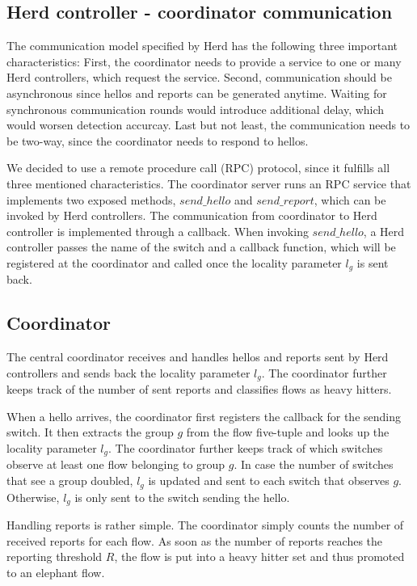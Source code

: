 \documentclass[11pt,oneside,a4paper]{article}
\begin{document}
\subsection{Herd controller - coordinator communication} \label{communication}

The communication model specified by Herd has the following three important characteristics: First, the coordinator needs to provide a service to one or many Herd controllers, which request the service. Second, communication should be asynchronous since hellos and reports can be generated anytime. Waiting for synchronous communication rounds would introduce additional delay, which would worsen detection accurcay. Last but not least, the communication needs to be two-way, since the coordinator needs to respond to hellos.

We decided to use a remote procedure call (RPC) protocol, since it fulfills all three mentioned characteristics. The coordinator server runs an RPC service that implements two exposed methods, $send\_hello$ and $send\_report$, which can be invoked by Herd controllers. The communication from coordinator to Herd controller is implemented through a callback. When invoking $send\_hello$, a Herd controller passes the name of the switch and a callback function, which will be registered at the coordinator and called once the locality parameter $l_g$ is sent back.


\subsection{Coordinator} \label{coordinator}
The central coordinator receives and handles hellos and reports sent by Herd controllers and sends back the locality parameter $l_g$. The coordinator further keeps track of the number of sent reports and classifies flows as heavy hitters.

\noindent When a hello arrives, the coordinator first registers the callback for the sending switch. It then extracts the group $g$ from the flow five-tuple and looks up the locality parameter $l_g$. The coordinator further keeps track of which switches observe at least one flow belonging to group $g$. In case the number of switches that see a group doubled, $l_g$ is updated and sent to each switch that observes $g$. Otherwise, $l_g$ is only sent to the switch sending the hello.

Handling reports is rather simple. The coordinator simply counts the number of received reports for each flow. As soon as the number of reports reaches the reporting threshold $R$, the flow is put into a heavy hitter set and thus promoted to an elephant flow.
\end{document}
